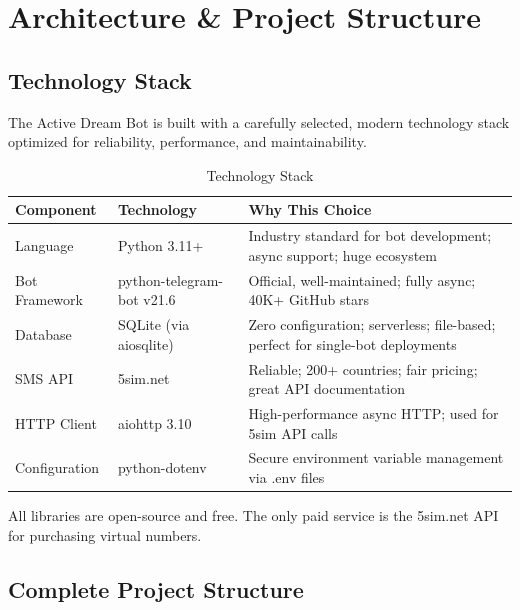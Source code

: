 
\chapter{Architecture \& Project Structure}

\section{Technology Stack}

The Active Dream Bot is built with a carefully selected, modern technology stack optimized for reliability, performance, and maintainability.

\begin{table}[H]
\centering
\caption{Technology Stack}
\begin{tabularx}{\textwidth}{|l|l|X|}
\hline
\textbf{Component} & \textbf{Technology} & \textbf{Why This Choice} \\
\hline
Language & Python 3.11+ & Industry standard for bot development; async support; huge ecosystem \\
\hline
Bot Framework & python-telegram-bot v21.6 & Official, well-maintained; fully async; 40K+ GitHub stars \\
\hline
Database & SQLite (via aiosqlite) & Zero configuration; serverless; file-based; perfect for single-bot deployments \\
\hline
SMS API & 5sim.net & Reliable; 200+ countries; fair pricing; great API documentation \\
\hline
HTTP Client & aiohttp 3.10 & High-performance async HTTP; used for 5sim API calls \\
\hline
Configuration & python-dotenv & Secure environment variable management via .env files \\
\hline
\end{tabularx}
\end{table}

\begin{infobox}
All libraries are open-source and free. The only paid service is the 5sim.net API for purchasing virtual numbers.
\end{infobox}

\section{Complete Project Structure}

